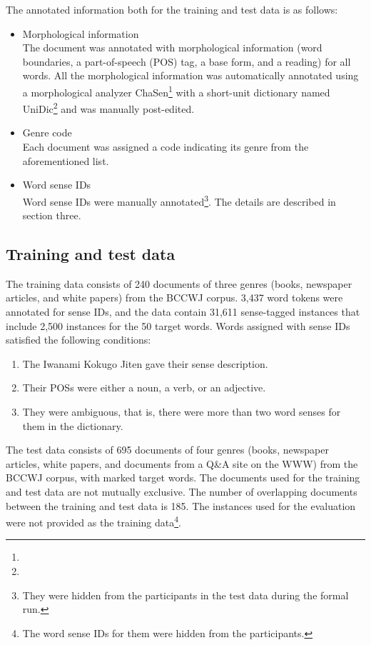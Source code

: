 \documentclass[english]{jnlp_1.4}
\newcommand{\url}[1]{}
\begin{document}
The annotated information both for the training and test data is as
follows:
\begin{itemize}
\item Morphological information\\
The document was annotated with morphological information (word
boundaries, a part-of-speech (POS) tag, a base form, and a reading) for
all words. All the morphological information was automatically annotated
using a morphological analyzer ChaSen\footnote{\url{http://chasen-legacy.sourceforge.jp/}} with
a short-unit dictionary named UniDic\footnote{\url{http://www.tokuteicorpus.jp/dist/}} and was manually
post-edited.
\item Genre code\\
Each document was assigned a code indicating its genre from the
aforementioned list.
\item Word sense IDs\\
Word sense IDs were manually annotated\footnote{They were hidden from
  the participants in the test data during the formal
  run.}. The details are described in section three.
\end{itemize}


\subsection{Training and test data}

The training data consists of 240 documents of three genres (books,
newspaper articles, and white papers) from the BCCWJ corpus.
3,437 word tokens were annotated for sense IDs, and the data
contain 31,611 sense-tagged instances that include 2,500 instances for
the 50 target words. Words assigned with sense IDs satisfied the
following conditions:
\begin{enumerate}
\item The Iwanami Kokugo Jiten gave their sense description.
\item Their POSs were either a noun, a verb, or an adjective.
\item They were ambiguous, that is, there were more than two word
  senses for them in the dictionary.
\end{enumerate}

The test data consists of 695 documents of four genres (books, newspaper
articles, white papers, and documents from a Q\&A site on the WWW) from
the BCCWJ corpus, with marked target words.
The documents used for the training and test data are not mutually
exclusive. The number of overlapping documents between the training and
test data is 185. 
The instances used for the evaluation were not provided as the
training data\footnote{The word sense IDs for them were hidden from
the participants.}.
\end{document}
